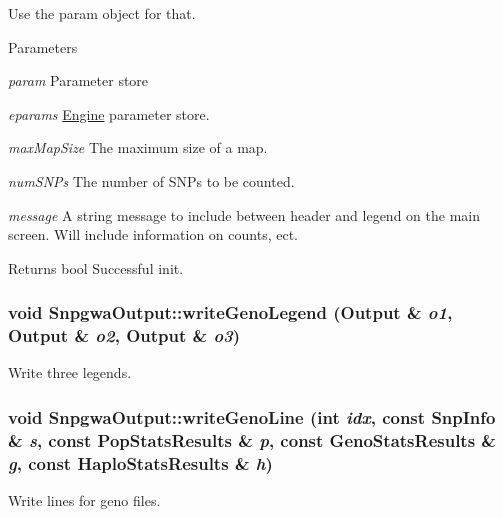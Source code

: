 Use the param object for that.


\begin{DoxyParams}{Parameters}
\item[{\em param}]Parameter store \item[{\em eparams}]\hyperlink{classEngine}{Engine} parameter store. \item[{\em maxMapSize}]The maximum size of a map. \item[{\em numSNPs}]The number of SNPs to be counted. \item[{\em message}]A string message to include between header and legend on the main screen. Will include information on counts, ect.\end{DoxyParams}
\begin{DoxyReturn}{Returns}
bool Successful init. 
\end{DoxyReturn}
\hypertarget{classSnpgwaOutput_a429ecd2ef4d0112dd889b5b36f858ab7}{
\subsubsection[{writeGenoLegend}]{\setlength{\rightskip}{0pt plus 5cm}void SnpgwaOutput::writeGenoLegend ({\bf Output} \& {\em o1}, \/  {\bf Output} \& {\em o2}, \/  {\bf Output} \& {\em o3})}}
\label{classSnpgwaOutput_a429ecd2ef4d0112dd889b5b36f858ab7}
Write three legends. \hypertarget{classSnpgwaOutput_a303a7331ed885b2f9c400ba25823a8c0}{
\subsubsection[{writeGenoLine}]{\setlength{\rightskip}{0pt plus 5cm}void SnpgwaOutput::writeGenoLine (int {\em idx}, \/  const {\bf SnpInfo} \& {\em s}, \/  const {\bf PopStatsResults} \& {\em p}, \/  const {\bf GenoStatsResults} \& {\em g}, \/  const {\bf HaploStatsResults} \& {\em h})}}
\label{classSnpgwaOutput_a303a7331ed885b2f9c400ba25823a8c0}
Write lines for geno files.


